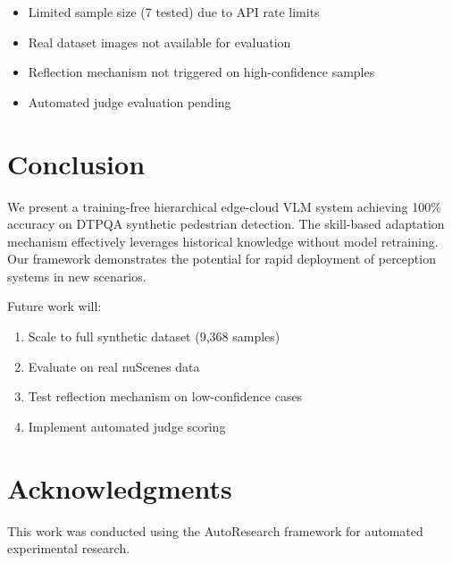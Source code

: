 \documentclass[11pt,a4paper]{article}
\begin{document}
\begin{itemize}
    \item Limited sample size (7 tested) due to API rate limits
    \item Real dataset images not available for evaluation
    \item Reflection mechanism not triggered on high-confidence samples
    \item Automated judge evaluation pending
\end{itemize}

\section{Conclusion}

We present a training-free hierarchical edge-cloud VLM system achieving 100\% accuracy on DTPQA synthetic pedestrian detection. The skill-based adaptation mechanism effectively leverages historical knowledge without model retraining. Our framework demonstrates the potential for rapid deployment of perception systems in new scenarios.

Future work will:
\begin{enumerate}
    \item Scale to full synthetic dataset (9,368 samples)
    \item Evaluate on real nuScenes data
    \item Test reflection mechanism on low-confidence cases
    \item Implement automated judge scoring
\end{enumerate}

\section*{Acknowledgments}

This work was conducted using the AutoResearch framework for automated experimental research.
\end{document}
